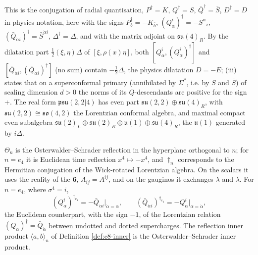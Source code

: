 \begin{remark}
This is the conjugation of radial quantisation, $P^\dagger=K$, $Q^\dagger=S$, $\bar Q^\dagger=\bar S$, $D^\dagger=D$ in physics notation, here with the signs $P_b^\dagger=-K_{\bar b}$, $(Q^i_\alpha)^\dagger=-S^\alpha{}_i$, $(\bar Q_{\dot\alpha i})^\dagger=\bar S^{\dot\alpha i}$, $\Delta^\dagger=\Delta$, and with the matrix adjoint on $\mathfrak{su}(4)_R$. By the dilatation part $\tfrac12(\xi,\eta)\Delta$ of $[\xi,\rho(x)\eta]$, both $[Q^i_\alpha,(Q^i_\alpha)^\dagger]$ and $[\bar Q_{\dot\alpha i},(\bar Q_{\dot\alpha i})^\dagger]$ (no sum) contain $-\tfrac12\Delta$, the physics dilatation $D=-E$; (iii) states that on a superconformal primary (annihilated by $\Sigma^*$, i.e. by $S$ and $\bar S$) of scaling dimension $d>0$ the norms of its $Q$-descendants are positive for the sign $+$. The real form $\mathfrak{psu}(2,2|4)$ has even part $\mathfrak{su}(2,2)\oplus\mathfrak{su}(4)_R$, with $\mathfrak{su}(2,2)\cong\mathfrak{so}(4,2)$ the Lorentzian conformal algebra, and maximal compact even subalgebra $\mathfrak{su}(2)_L\oplus\mathfrak{su}(2)_R\oplus\mathfrak u(1)\oplus\mathfrak{su}(4)_R$, the $\mathfrak u(1)$ generated by $i\Delta$.
\end{remark}

\begin{remark}
$\Theta_n$ is the Osterwalder--Schrader reflection in the hyperplane orthogonal to $n$; for $n=e_4$ it is Euclidean time reflection $x^4\mapsto-x^4$, and $\dagger_n$ corresponds to the Hermitian conjugation of the Wick-rotated Lorentzian algebra. On the scalars it uses the reality of the $\mathbf6$, $\overline{A_{ij}}=A^{ij}$, and on the gauginos it exchanges $\lambda$ and $\bar\lambda$. For $n=e_4$, where $\sigma^4=i$,
\[
(Q^i_\alpha)^{\dagger_{e_4}}=-\bar Q_{\dot\alpha i}\big|_{\dot\alpha=\alpha},\qquad (\bar Q_{\dot\alpha i})^{\dagger_{e_4}}=-Q^i_\alpha\big|_{\alpha=\dot\alpha},
\]
the Euclidean counterpart, with the sign $-1$, of the Lorentzian relation $(Q_\alpha)^\dagger=\bar Q_{\dot\alpha}$ between undotted and dotted supercharges. The reflection inner product $\langle a,b\rangle_n$ of Definition \ref{def:c8-inner} is the Osterwalder--Schrader inner product.
\end{remark}

